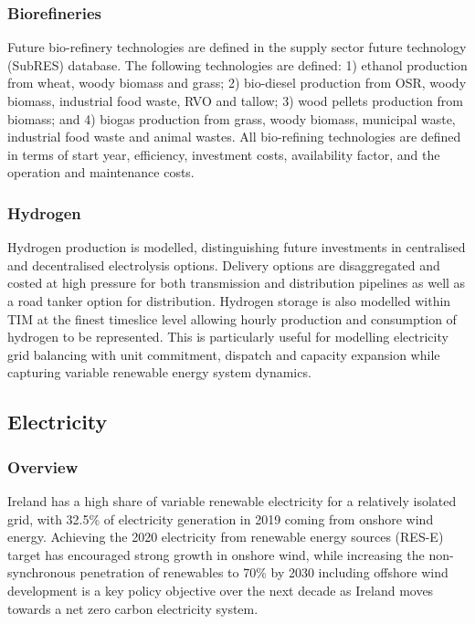 \documentclass[gmd,manuscript]{copernicus}
\begin{document}
\subsubsection{Biorefineries}
Future bio-refinery technologies are defined in the supply sector future technology (SubRES) database. The following technologies are defined: 1) ethanol production from wheat, woody biomass and grass; 2) bio-diesel production from OSR, woody biomass, industrial food waste, RVO and tallow; 3) wood pellets production from biomass; and 4) biogas production from grass, woody biomass, municipal waste, industrial food waste and animal wastes. All bio-refining technologies are defined in terms of start year, efficiency, investment costs, availability factor, and the operation and maintenance costs.

\subsubsection{Hydrogen}
Hydrogen production is modelled, distinguishing future investments in centralised and decentralised electrolysis options. Delivery options are disaggregated and costed at high pressure for both transmission and distribution pipelines as well as a road tanker option for distribution. Hydrogen storage is also modelled within TIM at the finest timeslice level allowing hourly production and consumption of hydrogen to be represented. This is particularly useful for modelling electricity grid balancing with unit commitment, dispatch and capacity expansion while capturing variable renewable energy system dynamics.

\subsection{Electricity}
\label{ss:power}

\subsubsection{Overview}
Ireland has a high share of variable renewable electricity for a relatively isolated grid, with 32.5\% of electricity generation in 2019 coming from onshore wind energy. Achieving the 2020 electricity from renewable energy sources (RES-E) target has encouraged strong growth in onshore wind, while increasing the non-synchronous penetration of renewables to 70\% by 2030 including offshore wind development is a key policy objective over the next decade as Ireland moves towards a net zero carbon electricity system. 
\end{document}
